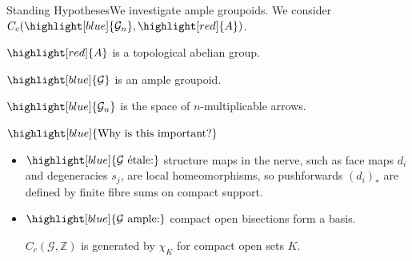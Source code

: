 \documentclass[aspectratio=169]{beamer}
\newcommand{\G}{\mathcal{G}}
\newcommand{\ZZ}{\mathbb{Z}}
\begin{document}
\begin{frame}{Standing Hypotheses}{We investigate ample groupoids.}
  We consider \(C_c(\highlight[blue]{\mathcal{G}_n},\highlight[red]{A})\).

  \(\highlight[red]{A}\) is a topological abelian group.

  \(\highlight[blue]{\mathcal{G}}\) is an ample groupoid.

  \(\highlight[blue]{\mathcal{G}_n}\) is the space of \(n\)\nobreakdash-multiplicable arrows.

  \vspace{1em}
  \pause
  \(\highlight[blue]{\text{Why is this important?}}\)
  \vspace{0.2em}
  \begin{itemize}[noitemsep,nolistsep]
    \item
      \(\highlight[blue]{\G \ \text{\'etale:}}\) structure maps in the nerve, such as face maps \(d_i\) and degeneracies \(s_j\), are local homeomorphisms, so pushforwards \((d_i)_*\) are defined by finite fibre sums on compact support.\pause
    \item
      \(\highlight[blue]{\G \ \text{ample:}}\) compact open bisections form a basis.

      \(C_c(\G,\ZZ)\) is generated by \(\chi_K\) for compact open sets \(K\).
  \end{itemize}
\end{frame}
\end{document}
